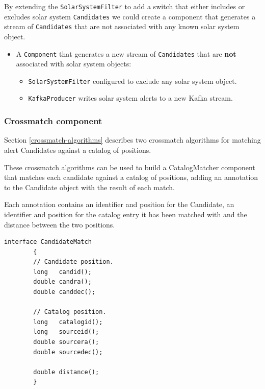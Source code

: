 \documentclass{article}
\newcommand{\kafka} {Kafka\xspace}
\newcommand{\crossmatch} {crossmatch\xspace}
\newcommand{\catalog} {catalog\xspace}
\newcommand{\javaname}[1] {{\ttfamily\color{codeblue} #1}}
\begin{document}
By extending the \texttt{SolarSystemFilter} to add a switch that either includes or excludes solar system \texttt{Candidates} we could create a component that generates a stream of \texttt{Candidates} that are not associated with any known solar system object.

\begin{itemize}
    \item A \texttt{Component} that generates a new stream of \texttt{Candidates} that are \textbf{not} associated with solar system objects:
    \begin{itemize}
        \item \texttt{SolarSystemFilter} configured to exclude any solar system object.
    \end{itemize}
    \begin{itemize}
        \item \texttt{KafkaProducer} writes solar system alerts to a new \kafka stream.
    \end{itemize}
\end{itemize}

\subsubsection{Crossmatch component}
\label{workflow.cross-match}

Section \ref{crossmatch-algorithms} describes two \crossmatch algorithms for matching alert Candidates against a \catalog of positions.

These \crossmatch algorithms can be used to build a \javaname{CatalogMatcher} component that matches each candidate against a \catalog of positions, adding an annotation to the \javaname{Candidate} object with the result of each match.

Each annotation contains an identifier and position for the \javaname{Candidate}, an identifier and position for the \catalog entry it has been matched with and the distance between the two positions.

\begin{lstlisting}[style=Java]
    interface CandidateMatch
        {
        // Candidate position.
        long   candid();
        double candra();
        double canddec();

        // Catalog position.
        long   catalogid();
        long   sourceid();
        double sourcera();
        double sourcedec();

        double distance();
        }
\end{lstlisting}
\end{document}
